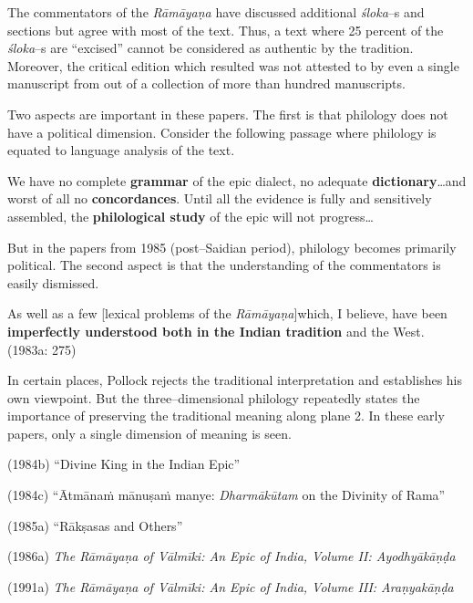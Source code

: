 The commentators of the \textit{Rāmāyaṇa }have discussed additional \textit{śloka}–s and sections but agree with most of the text. Thus, a text where 25 percent of the \textit{śloka}–s are “excised” cannot be considered as authentic by the tradition. Moreover, the critical edition which resulted was not attested to by even a single manuscript from out of a collection of more than hundred manuscripts.

Two aspects are important in these papers. The first is that philology does not have a political dimension. Consider the following passage where philology is equated to language analysis of the text.

\begin{myquote}
We have no complete \textbf{grammar} of the epic dialect, no adequate \textbf{dictionary}…and worst of all no \textbf{concordances}. Until all the evidence is fully and sensitively assembled, the \textbf{philological study} of the epic will not progress…
\end{myquote}

But in the papers from 1985 (post–Saidian period), philology becomes primarily political. The second aspect is that the understanding of the commentators is easily dismissed.

\begin{myquote}
As well as a few [lexical problems of the \textit{Rāmāyaṇa}]which, I believe, have been \textbf{imperfectly understood both in the Indian tradition} and the West. (1983a: 275)
\end{myquote}

In certain places, Pollock rejects the traditional interpretation and establishes his own viewpoint. But the three–dimensional philology repeatedly states the importance of preserving the traditional meaning along plane 2. In these early papers, only a single dimension of meaning is seen.

(1984b) “Divine King in the Indian Epic”

(1984c) “Ātmānaṁ mānuṣaṁ manye: \textit{Dharmākūtam} on the Divinity of Rama”

(1985a) “Rākṣasas and Others”

(1986a)\textit{ The Rāmāyaṇa of Vālmīki: An Epic of India, Volume II: Ayodhyākāṇḍa}

(1991a)\textit{ The Rāmāyaṇa of Vālmīki: An Epic of India, Volume III: Araṇyakāṇḍa}

